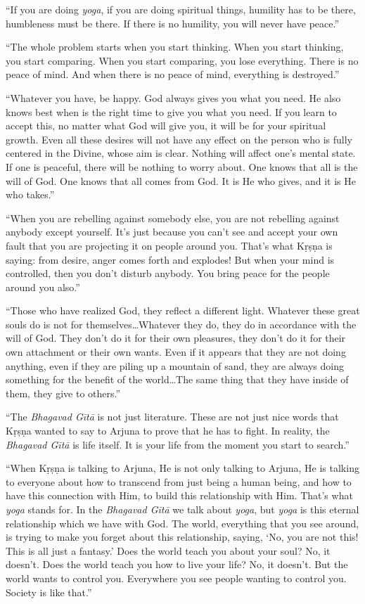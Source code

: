 \documentclass[12pt, twoside, openright]{memoir}
\begin{document}
\enquote{If you are doing \textit{yoga}, if you are doing spiritual things, humility has to be there, humbleness must be there. If there is no humility, you will never have peace.}

\enquote{The whole problem starts when you start thinking. When you start thinking, you start comparing. When you start comparing, you lose everything. There is no peace of mind. And when there is no peace of mind, everything is destroyed.}

\enquote{Whatever you have, be happy. God always gives you what you need. He also knows best when is the right time to give you what you need. If you learn to accept this, no matter what God will give you, it will be for your spiritual growth. Even all these desires will not have any effect on the person who is fully centered in the Divine, whose aim is clear. Nothing will affect one’s mental state. If one is peaceful, there will be nothing to worry about. One knows that all is the will of God. One knows that all comes from God. It is He who gives, and it is He who takes.}

\enquote{When you are rebelling against somebody else, you are not rebelling against anybody except yourself. It’s just because you can’t see and accept your own fault that you are projecting it on people around you. That’s what Kṛṣṇa is saying: from desire, anger comes forth and explodes! But when your mind is controlled, then you don’t disturb anybody. You bring peace for the people around you also.}

\enquote{Those who have realized God, they reflect a different light. Whatever these great souls do is not for themselves\ldots Whatever they do, they do in accordance with the will of God. They don’t do it for their own pleasures, they don’t do it for their own attachment or their own wants. Even if it appears that they are not doing anything, even if they are piling up a mountain of sand, they are always doing something for the benefit of the world\ldots The same thing that they have inside of them, they give to others.}

\enquote{The \textit{Bhagavad Gītā} is not just literature. These are not just nice words that Kṛṣṇa wanted to say to Arjuna to prove that he has to fight. In reality, the \textit{Bhagavad Gītā} is life itself. It is your life from the moment you start to search.}

\enquote{When Kṛṣṇa is talking to Arjuna, He is not only talking to Arjuna, He is talking to everyone about how to transcend from just being a human being, and how to have this connection with Him, to build this relationship with Him. That’s what \textit{yoga} stands for. In the \textit{Bhagavad Gītā} we talk about \textit{yoga}, but \textit{yoga} is this eternal relationship which we have with God. The world, everything that you see around, is trying to make you forget about this relationship, saying, \enquote{No, you are not this! This is all just a fantasy.} Does the world teach you about your soul? No, it doesn’t. Does the world teach you how to live your life? No, it doesn’t. But the world wants to control you. Everywhere you see people wanting to control you. Society is like that.}
\end{document}
